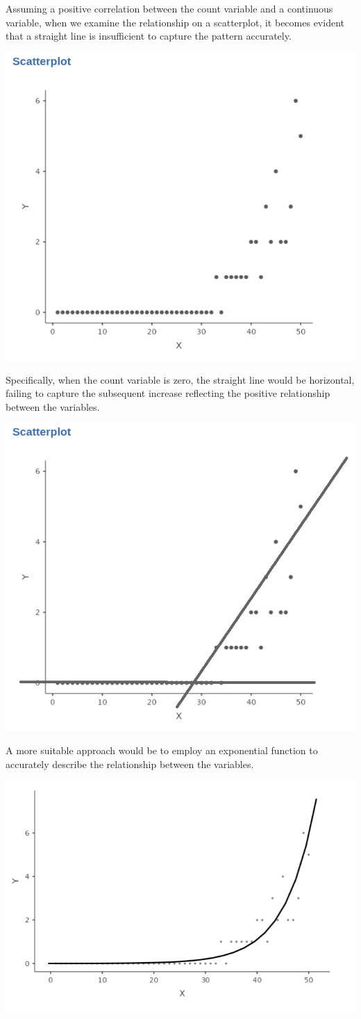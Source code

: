 \documentclass[
]{book}
\begin{document}
Assuming a positive correlation between the count variable and a continuous variable, when we examine the relationship on a scatterplot, it becomes evident that a straight line is insufficient to capture the pattern accurately.

\includegraphics[width=0.6\linewidth]{bookletpics/3_poisson_theory5}

Specifically, when the count variable is zero, the straight line would be horizontal, failing to capture the subsequent increase reflecting the positive relationship between the variables.

\includegraphics[width=0.6\linewidth]{bookletpics/3_poisson_theory6}

A more suitable approach would be to employ an exponential function to accurately describe the relationship between the variables.

\includegraphics[width=0.6\linewidth]{bookletpics/3_poisson_theory7}
\end{document}
